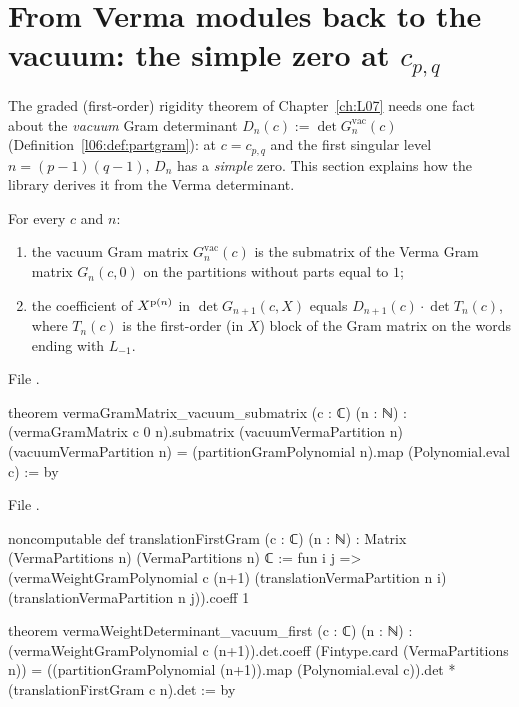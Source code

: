 \section{From Verma modules back to the vacuum: the simple zero at \texorpdfstring{$c_{p,q}$}{c(p,q)}}\label{l06:sec:vacuumkac}

The graded (first-order) rigidity theorem of Chapter~\ref{ch:L07} needs one fact about the \emph{vacuum} Gram determinant
$D_n(c) := \det G^{\mathrm{vac}}_n(c)$ (Definition~\ref{l06:def:partgram}): at $c = c_{p,q}$ and the first
singular level $n = (p-1)(q-1)$, $D_n$ has a \emph{simple} zero. This section explains how the library
derives it from the Verma determinant.

\begin{theorem}\label{l06:thm:vacblock}
For every $c$ and $n$:
\begin{enumerate}
\item the vacuum Gram matrix $G^{\mathrm{vac}}_n(c)$ is the submatrix of the Verma Gram matrix $G_n(c,0)$ on
  the partitions without parts equal to $1$;
\item the coefficient of $X^{\mathrm{p}(n)}$ in $\det G_{n+1}(c,X)$ equals
  $D_{n+1}(c)\cdot\det T_n(c)$, where $T_n(c)$ is the first-order (in $X$) block of the Gram matrix on the
  words ending with $L_{-1}$.
\end{enumerate}
\end{theorem}

File .
\begin{leancode}
theorem vermaGramMatrix_vacuum_submatrix (c : ℂ) (n : ℕ) :
    (vermaGramMatrix c 0 n).submatrix (vacuumVermaPartition n) (vacuumVermaPartition n) =
      (partitionGramPolynomial n).map (Polynomial.eval c) := by
\end{leancode}
File .
\begin{leancode}
noncomputable def translationFirstGram (c : ℂ) (n : ℕ) :
    Matrix (VermaPartitions n) (VermaPartitions n) ℂ := fun i j =>
  (vermaWeightGramPolynomial c (n+1)
    (translationVermaPartition n i) (translationVermaPartition n j)).coeff 1

theorem vermaWeightDeterminant_vacuum_first (c : ℂ) (n : ℕ) :
    (vermaWeightGramPolynomial c (n+1)).det.coeff (Fintype.card (VermaPartitions n)) =
      ((partitionGramPolynomial (n+1)).map (Polynomial.eval c)).det *
        (translationFirstGram c n).det := by
\end{leancode}

